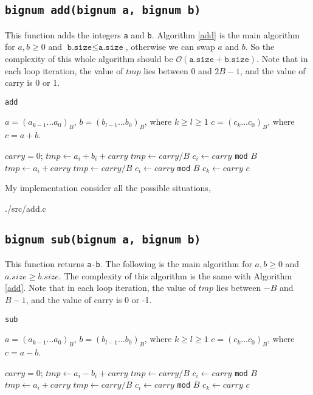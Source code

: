 \subsection{\texttt{bignum add(bignum a, bignum b)}}
This function adds the integers \texttt{a} and \texttt{b}.
Algorithm \ref{add} is the main algorithm for $a, b \geq 0$ and $\texttt{b.size} \leq
\texttt{a.size}$, otherwise we can swap $a$ and $b$. So the complexity of this
whole algorithm should be $\mathcal{O}(\texttt{a.size}+\texttt{b.size})$.
Note that in each loop iteration, the value of $tmp$ lies between 0 and $2B-1$,
and the value of carry is 0 or 1.
\begin{algorithm} 
\caption{\texttt{add}}
\label{add}
  \begin{algorithmic}[1]
    \Require $a = (a_{k-1}...a_0)_B$, $b = (b_{l-1}...b_0)_B$, where $k \geq l \geq
    1$
    \Ensure $c = (c_k...c_0)_B$, where $c = a + b$.

    \State $carry = 0$;
      \State $tmp \gets a_i + b_i + carry$
      \State $tmp \gets carry / B$
      \State $c_i \gets carry$ \texttt{mod} $B$
    \EndFor
      \State $tmp \gets a_i + carry$
      \State $tmp \gets carry / B$
      \State $c_i \gets carry$ \texttt{mod} $B$
    \EndFor
    \State $c_k \gets carry$
    \State \Return $c$
  \end{algorithmic}
\end{algorithm}


My implementation consider all the possible situations,

{./src/add.c}

\subsection{\texttt{bignum sub(bignum a, bignum b)}}
This function returns \texttt{a-b}.
The following is the main algorithm for $a, b \geq 0$  and $a.size \geq b.size$.
The complexity of this algorithm is the same with Algorithm \ref{add}.
Note that in each loop iteration, the value of $tmp$ lies between $-B$ and $B-1$,
and the value of carry is 0 or -1.
\begin{algorithm} 
\caption{\texttt{sub}}
  \begin{algorithmic}[1]
    \Require $a = (a_{k-1}...a_0)_B$, $b = (b_{l-1}...b_0)_B$, where $k \geq l \geq
    1$
    \Ensure $c = (c_k...c_0)_B$, where $c = a - b$.

    \State $carry = 0$;
      \State $tmp \gets a_i - b_i + carry$
      \State $tmp \gets carry / B$
      \State $c_i \gets carry$ \texttt{mod} $B$
    \EndFor
      \State $tmp \gets a_i + carry$
      \State $tmp \gets carry / B$
      \State $c_i \gets carry$ \texttt{mod} $B$
    \EndFor
    \State $c_k \gets carry$
    \State \Return $c$
  \end{algorithmic}
\end{algorithm}

